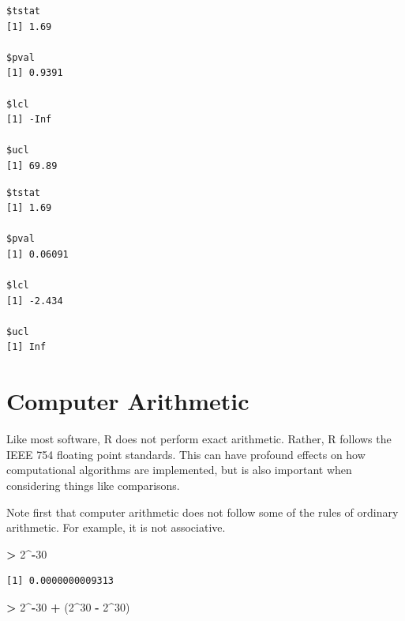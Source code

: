 \documentclass[]{krantz}
\makeatletter
\newenvironment{Shaded}{\begin{snugshade}}{\end{snugshade}}
\newcommand{\KeywordTok}[1]{\textcolor[rgb]{0.27,0.27,0.27}{\textbf{#1}}}
\newcommand{\DataTypeTok}[1]{\textcolor[rgb]{0.27,0.27,0.27}{#1}}
\newcommand{\DecValTok}[1]{\textcolor[rgb]{0.06,0.06,0.06}{#1}}
\newcommand{\StringTok}[1]{\textcolor[rgb]{0.5,0.5,0.5}{#1}}
\newcommand{\OperatorTok}[1]{\textcolor[rgb]{0.43,0.43,0.43}{\textbf{#1}}}
\newcommand{\NormalTok}[1]{#1}
\newenvironment{kframe}{%
\medskip{}
\setlength{\fboxsep}{.8em}
 \def\at@end@of@kframe{}%
 \ifinner\ifhmode%
  \def\at@end@of@kframe{\end{minipage}}%
  \begin{minipage}{\columnwidth}%
 \fi\fi%
 \def\FrameCommand##1{\hskip\@totalleftmargin \hskip-\fboxsep
 \colorbox{shadecolor}{##1}\hskip-\fboxsep
     \hskip-\linewidth \hskip-\@totalleftmargin \hskip\columnwidth}%
 \MakeFramed {\advance\hsize-\width
   \@totalleftmargin\z@ \linewidth\hsize
   \@setminipage}}%
 {\par\unskip\endMakeFramed%
 \at@end@of@kframe}
\renewenvironment{Shaded}{\begin{kframe}}{\end{kframe}}
\makeatother
\begin{document}
\begin{verbatim}
$tstat
[1] 1.69

$pval
[1] 0.9391

$lcl
[1] -Inf

$ucl
[1] 69.89
\end{verbatim}

\begin{Shaded}
\end{Shaded}

\begin{verbatim}
$tstat
[1] 1.69

$pval
[1] 0.06091

$lcl
[1] -2.434

$ucl
[1] Inf
\end{verbatim}

\section{Computer Arithmetic}\label{arith}

Like most software, R does not perform exact arithmetic. Rather, R
follows the IEEE 754 floating point standards. This can have profound
effects on how computational algorithms are implemented, but is also
important when considering things like comparisons.

Note first that computer arithmetic does not follow some of the rules of
ordinary arithmetic. For example, it is not associative.

\begin{Shaded}
\begin{Highlighting}[]
\OperatorTok{>}\StringTok{ }\DecValTok{2}\OperatorTok{^-}\DecValTok{30}
\end{Highlighting}
\end{Shaded}

\begin{verbatim}
[1] 0.0000000009313
\end{verbatim}

\begin{Shaded}
\begin{Highlighting}[]
\OperatorTok{>}\StringTok{ }\DecValTok{2}\OperatorTok{^-}\DecValTok{30} \OperatorTok{+}\StringTok{ }\NormalTok{(}\DecValTok{2}\OperatorTok{^}\DecValTok{30} \OperatorTok{-}\StringTok{ }\DecValTok{2}\OperatorTok{^}\DecValTok{30}\NormalTok{)}
\end{Highlighting}
\end{Shaded}
\end{document}
